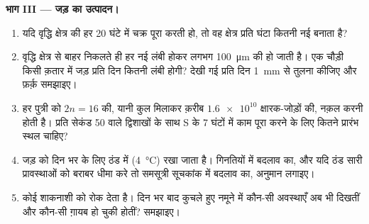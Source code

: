 \begin{problem}
\medskip
\noindent\textbf{भाग III --- जड़ का उत्पादन।}
\begin{enumerate}[resume]
  \item यदि वृद्धि क्षेत्र की हर  20 घंटे में चक्र पूरा करती हो, तो
        वह क्षेत्र प्रति घंटा कितनी नई  बनाता है?
  \item वृद्धि क्षेत्र से बाहर निकलते ही हर नई  लंबी होकर लगभग
        \qty{100}{\micro m} की हो जाती है। एक  चौड़ी किसी क़तार
        में जड़ प्रति दिन कितनी लंबी होगी? देखी गई प्रति दिन \qty{1}{mm}
        से तुलना कीजिए और फ़र्क़ समझाइए।
  \item हर पुत्री  को $2n = 16$  की, यानी कुल मिलाकर
        क़रीब $\num{1.6e10}$ क्षारक-जोड़ों की, नक़ल करनी होती है। प्रति
        सेकंड 50  वाले द्विशाखों के साथ S के 7 घंटों में
        काम पूरा करने के लिए कितने प्रारंभ स्थल चाहिए?
  \item जड़ को दिन भर के लिए ठंड में (\qty{4}{\celsius}) रखा जाता है।
        गिनतियों में बदलाव का, और यदि ठंड सारी प्रावस्थाओं को बराबर धीमा
        करे तो समसूत्री सूचकांक में बदलाव का, अनुमान लगाइए।
  \item कोई शाकनाशी  को रोक देता है। दिन भर बाद कुचले हुए
        नमूने में कौन-सी अवस्थाएँ अब भी दिखतीं और कौन-सी ग़ायब हो चुकी
        होतीं? समझाइए।
\end{enumerate}


\end{problem}
